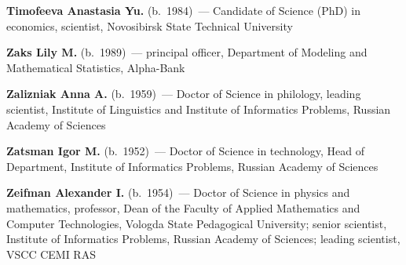 \begin{multicols}{2}
\noindent
\textbf{Timofeeva Anastasia Yu.} (b.\ 1984)~--- Candidate of Science (PhD) in economics, 
scientist, Novosibirsk State Technical University



\vspace*{4pt}

 \noindent
\textbf{Zaks Lily M.} (b.\ 1989)~--- principal officer, Department of Modeling and 
Mathematical Statistics, Alpha-Bank

\vspace*{4pt}

\noindent
\textbf{Zalizniak Anna A.} (b.\ 1959)~--- Doctor of Science in philology, 
leading scientist, Institute of Linguistics and Institute of Informatics Problems, 
Russian Academy of Sciences

\vspace*{4pt}

\noindent
\textbf{Zatsman Igor M.} (b.\ 1952)~--- Doctor of Science in technology, Head of Department, 
Institute of Informatics Problems, Russian Academy of Sciences

\vspace*{4pt}

\noindent
\textbf{Zeifman Alexander I.} (b.\ 1954)~--- Doctor of Science in physics and mathematics, 
professor, Dean of the Faculty of Applied Mathematics and Computer Technologies, 
Vologda State Pedagogical University; senior scientist, Institute of Informatics Problems, 
Russian Academy of Sciences; leading scientist, VSCC CEMI RAS

\end{multicols}
\newpage